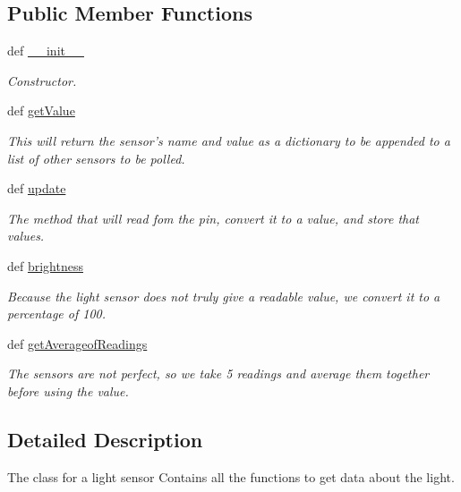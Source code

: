 \subsection*{Public Member Functions}
\begin{DoxyCompactItemize}
\item 
def \hyperlink{classsensing_1_1_light_sensor_a906bcf76dc955878006f8f72dc9e3105}{\-\_\-\-\_\-init\-\_\-\-\_\-}
\begin{DoxyCompactList}\small\item\em Constructor. \end{DoxyCompactList}\item 
def \hyperlink{classsensing_1_1_light_sensor_aab3cbdaa280ccafb57e62e918940cb89}{get\-Value}
\begin{DoxyCompactList}\small\item\em This will return the sensor's name and value as a dictionary to be appended to a list of other sensors to be polled. \end{DoxyCompactList}\item 
def \hyperlink{classsensing_1_1_light_sensor_add45ebed39d38396dff214a90c6d814a}{update}
\begin{DoxyCompactList}\small\item\em The method that will read fom the pin, convert it to a value, and store that values. \end{DoxyCompactList}\item 
def \hyperlink{classsensing_1_1_light_sensor_a18d4850e295f7154bf3ff99c95c7ada6}{brightness}
\begin{DoxyCompactList}\small\item\em Because the light sensor does not truly give a readable value, we convert it to a percentage of 100. \end{DoxyCompactList}\item 
def \hyperlink{classsensing_1_1_light_sensor_aaf57806c085727f8ec922b5baa5c1f3b}{get\-Averageof\-Readings}
\begin{DoxyCompactList}\small\item\em The sensors are not perfect, so we take 5 readings and average them together before using the value. \end{DoxyCompactList}\end{DoxyCompactItemize}


\subsection{Detailed Description}
The class for a light sensor Contains all the functions to get data about the light. 

